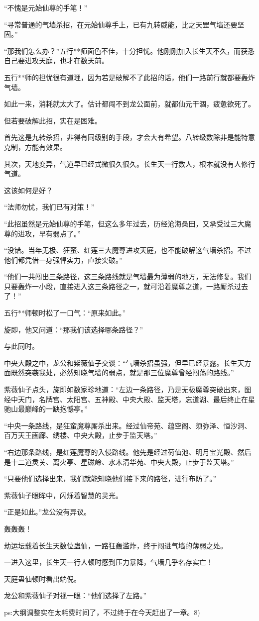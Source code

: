 \begin{this_body}
“不愧是元始仙尊的手笔！”

“寻常普通的气墙杀招，在元始仙尊手上，已有九转威能，比之天罡气墙还要坚固。”

“那我们怎么办？”五行**师面色不佳，十分担忧。他刚刚加入长生天不久，而获悉自己要进攻天庭，也才在数天前。

五行**师的担忧很有道理，因为若是破解不了此招的话，他们一路前行就都要轰炸气墙。

如此一来，消耗就太大了。估计都闯不到龙公面前，就都仙元干涸，疲惫欲死了。

但若要破解此招，实在是困难。

首先这是九转杀招，非得有同级别的手段，才会大有希望。八转级数除非是能特意克制，方能有效果。

其次，天地变异，气道早已经式微很久很久。长生天一行数人，根本就没有人修行气道。

这该如何是好？

“法师勿忧，我们已有对策！”

“此招虽然是元始仙尊的手笔，但这么多年过去，历经沧海桑田，又承受过三大魔尊的进攻，早有弱点了。”

“没错。当年无极、狂蛮、红莲三大魔尊进攻天庭，也不能破解这气墙杀招。不过他们都凭借一身强悍实力，直接突破。”

“他们一共闯出三条路径，这三条路线就是气墙最为薄弱的地方，无法修复。我们只要轰炸一小段，直接进入这三条路径之一，就可沿着魔尊之道，一路厮杀过去了！”

五行**师顿时松了一口气：“原来如此。”

旋即，他又问道：“那我们该选择哪条路径？”

与此同时。

中央大殿之中，龙公和紫薇仙子交谈：“气墙杀招虽强，但早已经暴露。长生天方面既然突袭我处，必然知晓气墙的弱点，就是那三位魔尊曾经闯荡的路线。”

紫薇仙子点头，旋即如数家珍地道：“左边一条路径，乃是无极魔尊突破出来，图经中天门，名牌宫、太阳宫、五神殿、中央大殿、监天塔，忘道湖、最后终止在星驰山最巅峰的一缺抱憾亭。”

“中央一条路线，是狂蛮魔尊厮杀出来。经过仙帝苑、蕴空阁、须弥泽、恒沙洞、百万天王画廊、绣楼、中央大殿，止步于监天塔。”

“右边那条路线，是红莲魔尊的入侵路线。他先是经过荷仙池、明月宝光殿、然后是十二道灵关、离火亭、星磁岭、水木清华苑、中央大殿，止步于监天塔。”

“只要他们选择出来，我们就能知晓他们接下来的路径，进行布防了。”

紫薇仙子眼眸中，闪烁着智慧的灵光。

“正是如此。”龙公没有异议。

轰轰轰！

劫运坛载着长生天数位蛊仙，一路狂轰滥炸，终于闯进气墙的薄弱之处。

一进入这里，长生天一行人顿时感到压力暴降，气墙几乎名存实亡！

天庭蛊仙顿时看出端倪。

龙公和紫薇仙子对视一眼：“他们选择了左路。”

ps:大纲调整实在太耗费时间了，不过终于在今天赶出了一章。8)

\end{this_body}

